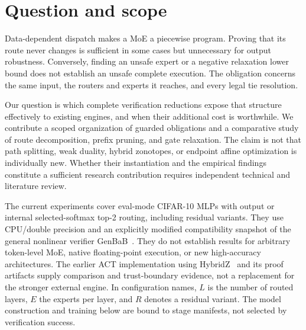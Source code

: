 \documentclass[11pt]{article}
\begin{document}
\section{Question and scope}
Data-dependent dispatch makes a MoE a piecewise program. Proving that its route
never changes is sufficient in some cases but unnecessary for output robustness.
Conversely, finding an unsafe expert or a negative relaxation lower bound does
not establish an unsafe complete execution. The obligation concerns the same
input, the routers and experts it reaches, and every legal tie resolution.

Our question is which complete verification reductions expose that structure
effectively to existing engines, and when their additional cost is worthwhile.
We contribute a scoped organization of guarded obligations and a comparative
study of route decomposition, prefix pruning, and gate relaxation. The claim is
not that path splitting, weak duality, hybrid zonotopes, or endpoint affine
optimization is individually new. Whether their instantiation and the empirical
findings constitute a sufficient research contribution requires independent
technical and literature review.

The current experiments cover eval-mode CIFAR-10 MLPs with output or internal
selected-softmax top-2 routing, including residual variants. They use CPU/double
precision and an explicitly modified compatibility snapshot of the general
nonlinear verifier GenBaB~\cite{genbab}. They do not establish results for
arbitrary token-level MoE, native floating-point execution, or new high-accuracy
architectures. The earlier ACT implementation using HybridZ~\cite{hz} and its proof
artifacts supply comparison and trust-boundary evidence, not a replacement for
the stronger external engine.
In configuration names, $L$ is the number of routed layers, $E$ the experts per
layer, and $R$ denotes a residual variant. The model construction and training
below are bound to stage manifests, not selected by verification success.
\end{document}
